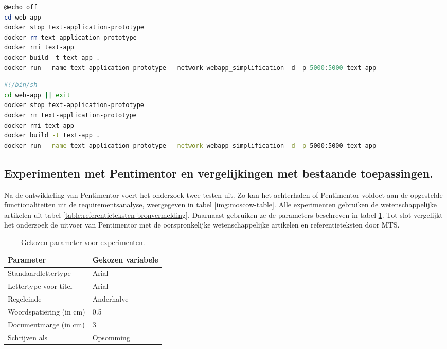 \begin{lstlisting}[language=Powershell, caption={Script voor het opstarten van de Docker-container voor Windows-gebruikers}, label={code:shell-boot}]
@echo off
cd web-app
docker stop text-application-prototype
docker rm text-application-prototype
docker rmi text-app
docker build -t text-app .
docker run --name text-application-prototype --network webapp_simplification -d -p 5000:5000 text-app
\end{lstlisting}

\begin{lstlisting}[language=Bash, caption={Script voor het opstarten van de Docker-container voor Unix-gebruikers}, label={code:bash-boot}]
#!/bin/sh	
cd web-app || exit
docker stop text-application-prototype
docker rm text-application-prototype
docker rmi text-app
docker build -t text-app .
docker run --name text-application-prototype --network webapp_simplification -d -p 5000:5000 text-app
\end{lstlisting}


\subsection{Experimenten met Pentimentor en vergelijkingen met bestaande toepassingen.}

Na de ontwikkeling van Pentimentor voert het onderzoek twee testen uit. Zo kan het achterhalen of Pentimentor voldoet aan de opgestelde functionaliteiten uit de requirementsanalyse, weergegeven in tabel \ref{img:moscow-table}. Alle experimenten gebruiken de wetenschappelijke artikelen uit tabel \ref{table:referentieteksten-bronvermelding}. Daarnaast gebruiken ze de parameters beschreven in tabel \ref{table:chosen-parameters-experiment}. Tot slot vergelijkt het onderzoek de uitvoer van Pentimentor met de oorspronkelijke wetenschappelijke artikelen en referentieteksten door MTS. 

\begin{table}
	\begin{tabular}{| m{5cm} | m{5cm} |}
	\hline
	\textbf{Parameter} & \textbf{Gekozen variabele} \\ \hline
	Standaardlettertype & Arial \\ \hline
	Lettertype voor titel & Arial \\ \hline
	Regeleinde & Anderhalve \\ \hline
	Woordspatiëring (in cm) & 0.5  \\ \hline
	Documentmarge (in cm) & 3 \\ \hline
	Schrijven als & Opsomming \\ \hline
	\end{tabular}
	\caption{Gekozen parameter voor experimenten.}
	\label{table:chosen-parameters-experiment}
\end{table}